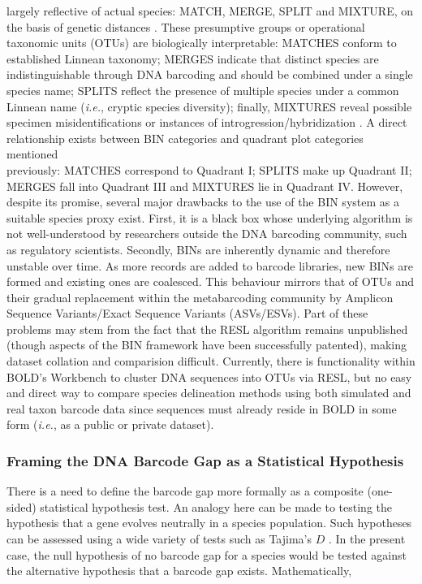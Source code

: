 largely reflective of actual species: MATCH, MERGE, SPLIT and MIXTURE, on the basis of genetic distances \cite{ratnasingham2013dna}. These presumptive groups or operational taxonomic units (OTUs) are biologically interpretable: MATCHES conform to established Linnean taxonomy;  MERGES indicate that distinct species are indistinguishable through DNA barcoding and should be combined under a single species name; SPLITS reflect the presence of multiple species under a common Linnean name (\textit{i.e.}, cryptic species diversity); finally, MIXTURES reveal possible specimen misidentifications or instances of introgression/hybridization \cite{ratnasingham2013dna, serrao2014calibrating}. A direct relationship exists between BIN categories and quadrant plot categories mentioned 
\\ previously: MATCHES correspond to Quadrant I; SPLITS make up Quadrant II; MERGES fall into Quadrant III and MIXTURES lie in Quadrant IV. However, despite its promise, several major drawbacks to the use of the BIN system as a suitable species proxy exist. First, it is a black box whose underlying algorithm is not well-understood by researchers outside the DNA barcoding community, such as regulatory scientists. Secondly, BINs are inherently dynamic and therefore unstable over time. As more records are added to barcode libraries, new BINs are formed and existing ones are coalesced. This behaviour mirrors that of OTUs and their gradual replacement within the metabarcoding community by Amplicon Sequence Variants/Exact Sequence Variants (ASVs/ESVs). Part of these problems may stem from the fact that the RESL algorithm remains unpublished (though aspects of the BIN framework have been successfully patented), making dataset collation and comparision difficult. Currently, there is functionality within BOLD's Workbench to cluster DNA sequences into OTUs via RESL, but no easy and direct way to compare species delineation methods using both simulated and real taxon barcode data since sequences must already reside in BOLD in some form (\textit{i.e.}, as a public or private dataset).



\subsubsection{Framing the DNA Barcode Gap as a Statistical Hypothesis}

There is a need to define the barcode gap more formally as a composite (one-sided) statistical hypothesis test. An analogy here can be made to testing the hypothesis that a gene evolves neutrally in a species population. Such hypotheses can be assessed using a wide variety of tests such as Tajima's $D$ \cite{tajima1983evolutionary}. In the present case, the null hypothesis of no barcode gap for a species would be tested against the alternative hypothesis that a barcode gap exists. Mathematically, 


